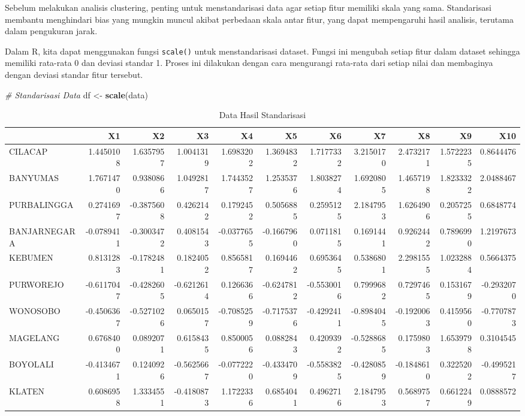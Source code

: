 \documentclass[
  oneside]{book}
\newenvironment{Shaded}{\begin{snugshade}}{\end{snugshade}}
\newcommand{\CommentTok}[1]{\textcolor[rgb]{0.56,0.35,0.01}{\textit{#1}}}
\newcommand{\FunctionTok}[1]{\textcolor[rgb]{0.13,0.29,0.53}{\textbf{#1}}}
\newcommand{\NormalTok}[1]{#1}
\newcommand{\OtherTok}[1]{\textcolor[rgb]{0.56,0.35,0.01}{#1}}
\begin{document}
Sebelum melakukan analisis clustering, penting untuk menstandarisasi data agar setiap fitur memiliki skala yang sama. Standarisasi membantu menghindari bias yang mungkin muncul akibat perbedaan skala antar fitur, yang dapat mempengaruhi hasil analisis, terutama dalam pengukuran jarak.

Dalam R, kita dapat menggunakan fungsi \texttt{scale()} untuk menstandarisasi dataset. Fungsi ini mengubah setiap fitur dalam dataset sehingga memiliki rata-rata 0 dan deviasi standar 1. Proses ini dilakukan dengan cara mengurangi rata-rata dari setiap nilai dan membaginya dengan deviasi standar fitur tersebut.

\begin{Shaded}
\begin{Highlighting}[]
\CommentTok{\# Standarisasi Data}
\NormalTok{df }\OtherTok{\textless{}{-}} \FunctionTok{scale}\NormalTok{(data)}
\end{Highlighting}
\end{Shaded}

\begin{table}

\caption{\label{tab:nice-tab-1}Data Hasil Standarisasi}
\centering
\begin{tabular}[t]{lrrrrrrrrrr}
\toprule
  & X1 & X2 & X3 & X4 & X5 & X6 & X7 & X8 & X9 & X10\\
\midrule
CILACAP & 1.4450108 & 1.6357957 & 1.0041319 & 1.6983202 & 1.3694832 & 1.7177332 & 3.2150170 & 2.4732171 & 1.5722235 & 0.8644476\\
BANYUMAS & 1.7671470 & 0.9380866 & 1.0492817 & 1.7443527 & 1.2535376 & 1.8038274 & 1.6920805 & 1.4657198 & 1.8233322 & 2.0488467\\
PURBALINGGA & 0.2741697 & -0.3875608 & 0.4262142 & 0.1792452 & 0.5056885 & 0.2595125 & 2.1847953 & 1.6264906 & 0.2057255 & 0.6848774\\
BANJARNEGARA & -0.0789411 & -0.3003472 & 0.4081543 & -0.0377655 & -0.1667960 & 0.0711815 & 0.1691441 & 0.9262442 & 0.7896990 & 1.2197673\\
KEBUMEN & 0.8131283 & -0.1782481 & 0.1824052 & 0.8565817 & 0.1694462 & 0.6953645 & 0.5386801 & 2.2981555 & 1.0232884 & 0.5664375\\
\addlinespace
PURWOREJO & -0.6117047 & -0.4282605 & -0.6212614 & 0.1266366 & -0.6247812 & -0.5530016 & 0.7999682 & 0.7297465 & 0.1531679 & -0.2932070\\
WONOSOBO & -0.4506367 & -0.5271026 & 0.0650157 & -0.7085259 & -0.7175376 & -0.4292411 & -0.8984045 & -0.1920063 & 0.4159560 & -0.7707873\\
MAGELANG & 0.6768400 & 0.0892071 & 0.6158435 & 0.8500056 & 0.0882843 & 0.4209392 & -0.5288685 & 0.1759803 & 1.6539798 & 0.3104545\\
BOYOLALI & -0.4134671 & 0.1240926 & -0.5625667 & -0.0772220 & -0.4334709 & -0.5583825 & -0.4280859 & -0.1848610 & 0.3225202 & -0.4995217\\
KLATEN & 0.6086958 & 1.3334551 & -0.4180873 & 1.1722336 & 0.6854041 & 0.4962716 & 2.1847953 & 0.5689757 & 0.6612249 & 0.0888572\\
\bottomrule
\end{tabular}
\end{table}
\end{document}
